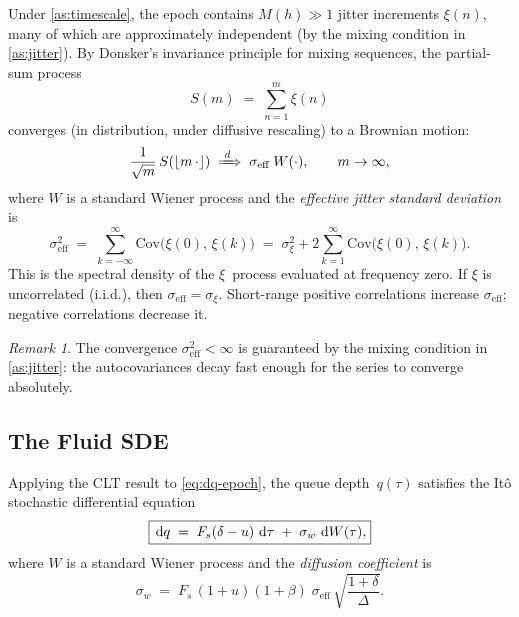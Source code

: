 \documentclass[11pt, a4paper]{article}
\theoremstyle{definition}
\theoremstyle{plain}
\theoremstyle{remark}
\newtheorem{remark}{Remark}[section]
\newcommand{\dd}{\,\mathrm{d}}                   %
\begin{document}
Under \cref{as:timescale}, the epoch contains $M(h) \gg 1$ jitter
increments $\xi(n)$, many of which are approximately independent
(by the mixing condition in \cref{as:jitter}).  By Donsker's
invariance principle for mixing sequences, the partial-sum process
\begin{equation}\label{eq:partial-sum}
  S(m) \;=\; \sum_{n=1}^{m} \xi(n)
\end{equation}
converges (in distribution, under diffusive rescaling) to a Brownian
motion:
\begin{equation}\label{eq:donsker}
  \frac{1}{\sqrt{m}}\,S(\lfloor m\,\cdot \rfloor)
  \;\xRightarrow{\;d\;}\; \sigma_{\text{eff}}\;W(\cdot),
  \qquad m \to \infty,
\end{equation}
where $W$ is a standard Wiener process and the
\emph{effective jitter standard deviation} is
\begin{equation}\label{eq:sigma-eff}
  \sigma_{\text{eff}}^2
    \;=\; \sum_{k=-\infty}^{\infty}
      \mathrm{Cov}\bigl(\xi(0),\,\xi(k)\bigr)
    \;=\; \sigma_\xi^2 + 2\sum_{k=1}^{\infty}
      \mathrm{Cov}\bigl(\xi(0),\,\xi(k)\bigr).
\end{equation}
This is the spectral density of the $\xi$~process evaluated at
frequency zero.  If $\xi$ is uncorrelated (i.i.d.), then
$\sigma_{\text{eff}} = \sigma_\xi$.  Short-range positive
correlations increase $\sigma_{\text{eff}}$; negative correlations
decrease it.

\begin{remark}
  The convergence
  $\sigma_{\text{eff}}^2 < \infty$ is guaranteed by the mixing
  condition in \cref{as:jitter}: the autocovariances decay fast
  enough for the series to converge absolutely.
\end{remark}

\subsection{The Fluid SDE}\label{sec:fluid-sde}

Applying the CLT result to \eqref{eq:dq-epoch}, the queue
depth~$q(\tau)$ satisfies the It\^{o} stochastic differential equation
\begin{equation}\label{eq:fluid-sde}
  \boxed{%
    \dd q \;=\; F_s(\delta - u)\,\dd\tau
          \;+\; \sigma_w\,\dd W(\tau),
  }
\end{equation}
where $W$ is a standard Wiener process and the
\emph{diffusion coefficient} is
\begin{equation}\label{eq:sigma-w}
  \sigma_w
    \;=\; F_s\,(1+u)(1+\beta)\;\sigma_{\text{eff}}\,
          \sqrt{\frac{1+\delta}{\Delta}}.
\end{equation}
\end{document}
